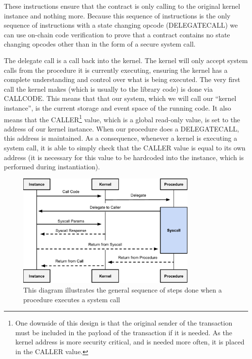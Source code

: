\documentclass[english,a4paper]{article}
\begin{document}
These instructions ensure that the contract is only calling to the
original kernel instance and nothing more. Because this sequence of
instructions is the only sequence of instructions with a state changing
opcode (DELEGATECALL) we can use on-chain code verification to prove
that a contract contains no state changing opcodes other than in the
form of a secure system call.

The delegate call is a call back into the kernel. The kernel will only
accept system calls from the procedure it is currently executing, ensuring the
kernel has a complete understanding and control over what is being executed.
The very first call the kernel makes (which is usually to the library code) is
done
via CALLCODE. This means that that our system, which we will call our
``kernel instance'', is the current storage and event space of the
running code. It also means that the CALLER\footnote{One downside of this design
is that the original sender of the transaction must be included in the payload
of the transaction if it is needed. As the kernel address is more security
critical, and is needed more often, it is placed in the CALLER value.} value,
which is a global
read-only value, is set to the address of our kernel instance. When our
procedure does a DELEGATECALL, this address is maintained. As a
consequence, whenever a kernel is executing a system call, it is able to
simply check that the CALLER value is equal to its own address (it is
necessary for this value to be hardcoded into the instance, which is
performed during instantiation).

\begin{figure}[htbp]
\centering
\includegraphics[width=0.8\textwidth]{media/SystemCalls.pdf}
\caption{This diagram illustrates the general sequence of steps
done when a procedure executes a system call}
\end{figure}
\end{document}
